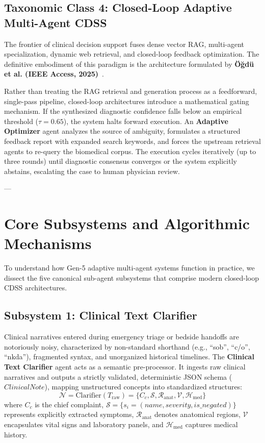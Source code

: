 \documentclass[conference]{IEEEtran}
\begin{document}
\subsection{Taxonomic Class 4: Closed-Loop Adaptive Multi-Agent CDSS}
The frontier of clinical decision support fuses dense vector RAG, multi-agent specialization, dynamic web retrieval, and closed-loop feedback optimization. The definitive embodiment of this paradigm is the architecture formulated by \textbf{Öğdü et al. (IEEE Access, 2025)}~\cite{ogdu2025adaptive}.

Rather than treating the RAG retrieval and generation process as a feedforward, single-pass pipeline, closed-loop architectures introduce a mathematical gating mechanism. If the synthesized diagnostic confidence falls below an empirical threshold ($\tau = 0.65$), the system halts forward execution. An \textbf{Adaptive Optimizer} agent analyzes the source of ambiguity, formulates a structured feedback report with expanded search keywords, and forces the upstream retrieval agents to re-query the biomedical corpus. The execution cycles iteratively (up to three rounds) until diagnostic consensus converges or the system explicitly abstains, escalating the case to human physician review.

---

\section{Core Subsystems and Algorithmic Mechanisms}

To understand how Gen-5 adaptive multi-agent systems function in practice, we dissect the five canonical sub-agent subsystems that comprise modern closed-loop CDSS architectures.

\subsection{Subsystem 1: Clinical Text Clarifier}
Clinical narratives entered during emergency triage or bedside handoffs are notoriously noisy, characterized by non-standard shorthand (e.g., ``sob'', ``c/o'', ``nkda''), fragmented syntax, and unorganized historical timelines. The \textbf{Clinical Text Clarifier} agent acts as a semantic pre-processor. It ingests raw clinical narratives and outputs a strictly validated, deterministic JSON schema ($ClinicalNote$), mapping unstructured concepts into standardized structures:
\begin{equation}
\mathcal{N} = \text{Clarifier}(T_{\text{raw}}) = \{C_c, \mathcal{S}, \mathcal{R}_{\text{anat}}, \mathcal{V}, \mathcal{H}_{\text{med}}\}
\end{equation}
where $C_c$ is the chief complaint, $\mathcal{S} = \{s_i = (name, severity, is\_negated)\}$ represents explicitly extracted symptoms, $\mathcal{R}_{\text{anat}}$ denotes anatomical regions, $\mathcal{V}$ encapsulates vital signs and laboratory panels, and $\mathcal{H}_{\text{med}}$ captures medical history.
\end{document}
